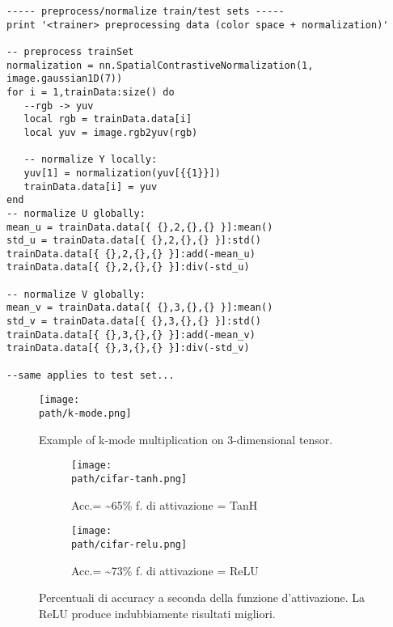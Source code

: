 \begin{lstlisting}[language={[5.2]Lua}]
----- preprocess/normalize train/test sets -----
print '<trainer> preprocessing data (color space + normalization)'

-- preprocess trainSet
normalization = nn.SpatialContrastiveNormalization(1, image.gaussian1D(7))
for i = 1,trainData:size() do
   --rgb -> yuv
   local rgb = trainData.data[i]
   local yuv = image.rgb2yuv(rgb)
   
   -- normalize Y locally:
   yuv[1] = normalization(yuv[{{1}}])
   trainData.data[i] = yuv
end
-- normalize U globally:
mean_u = trainData.data[{ {},2,{},{} }]:mean()
std_u = trainData.data[{ {},2,{},{} }]:std()
trainData.data[{ {},2,{},{} }]:add(-mean_u)
trainData.data[{ {},2,{},{} }]:div(-std_u)

-- normalize V globally:
mean_v = trainData.data[{ {},3,{},{} }]:mean()
std_v = trainData.data[{ {},3,{},{} }]:std()
trainData.data[{ {},3,{},{} }]:add(-mean_v)
trainData.data[{ {},3,{},{} }]:div(-std_v)

--same applies to test set...
\end{lstlisting}



\begin{figure}[h!]
 \centering
 \texttt{[image: \\path/k-mode.png]} 
  \caption{Example of k-mode multiplication on 3-dimensional tensor.}
 \label{fig:k-mode}
\end{figure}

\bigskip

\begin{figure}
\centering
\begin{subfigure}{.5\textwidth}
  \centering
 \texttt{[image: \\path/cifar-tanh.png]} 
  \caption{Acc.= \textasciitilde 65\% f. di attivazione = TanH}
 \label{fig:training}
\end{subfigure}%
\begin{subfigure}{.5\textwidth}
  \centering
 \texttt{[image: \\path/cifar-relu.png]} 
  \caption{Acc.= \textasciitilde 73\% f. di attivazione = ReLU}
 \label{fig:validation}
\end{subfigure}
\caption{Percentuali di accuracy a seconda della funzione d'attivazione. La ReLU produce indubbiamente risultati migliori.}
\label{fig:relu}
\end{figure}
\\
\newpage
\pagebreak
\medskip
\newpage

